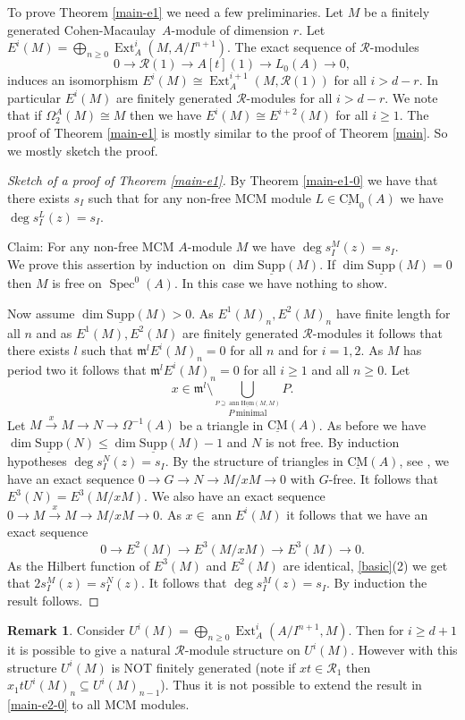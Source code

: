\documentclass{amsart}
\newcommand{\CM}{Cohen-Macaulay}
\newcommand{\m}{\mathfrak{m} }
\newcommand{\R}{\mathcal{R} }
\newcommand{\rt}{\rightarrow}
\newcommand{\Om}{\Omega}
\newcommand{\ann}{\operatorname{ann}}
\newcommand{\Supp}{\operatorname{\underline{Supp}}}
\newcommand{\Spec}{\operatorname{Spec}}
\newcommand{\CMS}{\operatorname{\underline{CM}}}
\newcommand{\sHom}{\operatorname{\underline{Hom}}}
\newcommand{\Ext}{\operatorname{Ext}}
\theoremstyle{plain}
\theoremstyle{definition}
\newtheorem{remark}[theorem]{Remark}
\theoremstyle{remark}
\begin{document}
\s To prove Theorem \ref{main-e1} we need a few preliminaries. Let $M$ be a finitely generated \CM \  $A$-module of dimension $r$. Let \\ $E^i(M) = \bigoplus_{n \geq 0}\Ext^i_A(M, A/I^{n+1})$.
The exact sequence of $\R$-modules
$$ 0 \rt \R(1) \rt A[t](1) \rt L_0(A) \rt 0,$$
induces an isomorphism $E^i(M) \cong \Ext^{i+1}_A(M, \R(1))$ for all $i > d -r$. In particular $E^i(M)$ are finitely generated $\R$-modules for all $i > d -r$.
We note that if $\Om^A_2(M) \cong M$ then we have $E^i(M) \cong E^{i+2}(M)$ for all $i \geq 1$. The proof of Theorem \ref{main-e1} is mostly similar to the proof of Theorem \ref{main}. So we mostly sketch the proof.
\begin{proof}[Sketch of a proof of Theorem \ref{main-e1}]
By Theorem \ref{main-e1-0} we have that there exists $s_I$ such that for any  non-free MCM module $L \in \CMS_0(A)$ we have $\deg s_I^L(z) = s_I$.

Claim: For any non-free MCM $A$-module $M$ we have $\deg s_I^M(z) = s_I$.\\
We prove this assertion by induction on $\dim \Supp(M)$. If $\dim \Supp(M) = 0$ then $M$ is free on $\Spec^0(A)$. In this case we have nothing to show.

Now assume $\dim \Supp(M) > 0$.
As $E^1(M)_n, E^2(M)_n$ have finite length for all $n$ and as $E^1(M), E^2(M)$ are finitely generated $\R$-modules it follows that there exists $l$ such that $\m^l E^i(M)_n = 0$ for all $n$ and for $i = 1, 2$. As $M$ has period two it follows that $\m^l E^i(M)_n = 0$ for all $i \geq 1$ and all $n \geq 0$.
Let
$$x \in \m^l \setminus \bigcup_{ \stackrel{P \supseteq \ann \sHom(M, M)}{P \ \text{minimal}}} P.$$
Let $M \xrightarrow{x} M \rt N \rt \Om^{-1}(A)$ be a triangle in $\CMS(A)$. As before we have $\dim \Supp(N) \leq \dim \Supp(M) -1$ and $N$ is not free. By induction hypotheses  $\deg s_I^N(z) = s_I$. By the structure of triangles in $\CMS(A)$, see \cite[4.4.1]{Buchw}, we have an exact sequence
$0 \rt G \rt N \rt M/xM \rt 0$ with $G$-free. It follows that $E^3(N) = E^3(M/xM)$. We also have an exact sequence
$0 \rt M \xrightarrow{x} M \rt M/xM \rt 0$. As $x \in \ann E^i(M)$ it follows that we have an exact sequence
$$ 0 \rt E^2(M) \rt E^3(M/xM) \rt E^3(M) \rt 0.$$
As the Hilbert function of $E^3(M)$ and $E^2(M)$ are identical, \ref{basic}(2) we get that
$2s_I^M(z) = s_I^N(z)$. It follows that $\deg s_I^M(z) = s_I$. By induction the result follows.
\end{proof}

\begin{remark}\label{why}
  Consider $U^i(M) = \bigoplus_{n \geq 0}\Ext^i_{A}(A/I^{n+1}, M)$. Then for $i \geq d+1$ it is  possible to give a natural $\R$-module structure on $U^i(M)$. However with this structure $U^i(M)$ is NOT finitely generated (note if $xt \in \R_1$ then $x_1t U^i(M)_n \subseteq U^i(M)_{n-1}$). Thus it is not possible to extend the result in \ref{main-e2-0} to all MCM modules.
\end{remark}
\end{document}
